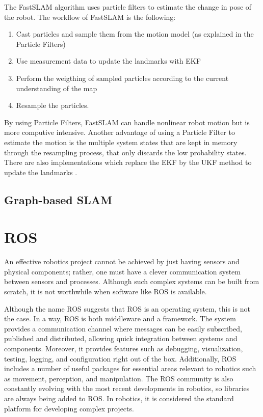 The FastSLAM algorithm \cite{thrun_fastslam_nodate} uses particle filters to estimate the change in pose of the robot. The workflow of FastSLAM is the following:
\begin{enumerate}
    \item Cast particles and sample them from the motion model (as explained in the Particle Filters)
    \item Use measurement data to update the landmarks with \acs*{EKF}
    \item Perform the weigthing of sampled particles according to the current understanding of the map 
    \item Resample the particles.
\end{enumerate}
By using Particle Filters, FastSLAM can handle nonlinear robot motion but is more computive intensive. Another advantage of using a Particle Filter to estimate the motion is the multiple system states that are kept in memory through the resampling process, that only discards the low probability states. There are also implementations which replace the \acs*{EKF} by the \acs*{UKF} method to update the landmarks \cite{wang_upf-ukf_2007}.


\subsection{Graph-based SLAM}

\section{\acs{ROS}}

An effective robotics project cannot be achieved by just having sensors and physical components; rather, one must have a clever communication system between sensors and processes. Although such complex systems can be built from scratch, it is not worthwhile when software like \acs*{ROS} is available.

Although the name \acl*{ROS} suggests that ROS is an operating system, this is not the case.  In a way, \acs*{ROS} is both middleware and a framework. The system provides a communication channel where messages can be easily subscribed, published and distributed, allowing quick integration between systems and components. Moreover, it provides features such as debugging, visualization, testing, logging, and configuration right out of the box. Additionally, ROS includes a number of useful packages for essential areas relevant to robotics such as movement, perception, and manipulation. The ROS community is also constantly evolving with the most recent developments in robotics, so libraries are always being added to ROS. In robotics, it is considered the standard platform for developing complex projects.


